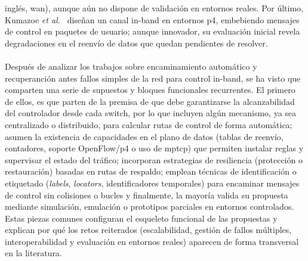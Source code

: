 inglés, \gls{wan}), aunque aún no dispone de validación en entornos reales.  Por último, Kumazoe \textit{et al.}~\cite{Kumazoe22} diseñan un canal in-band en entornos \gls{p4}, embebiendo mensajes de control en paquetes de usuario; aunque innovador, su evaluación inicial revela degradaciones en el reenvío de datos que quedan pendientes de resolver.\\
\\
Después de analizar los trabajos sobre encaminamiento automático y recuperanción antes fallos simples de la red para control in-band, se ha visto que comparten una serie de supuestos y bloques funcionales recurrentes. El primero de ellos, es que parten de la premisa de que debe garantizarse la alcanzabilidad del controlador desde cada switch, por lo que incluyen algún mecanismo, ya sea centralizado o distribuido, para calcular rutas de control de forma automática; asumen la existencia de capacidades en el plano de datos (tablas de reenvío, contadores, soporte OpenFlow/\gls{p4} o uso de \gls{mptcp}) que permiten instalar reglas y supervisar el estado del tráfico; incorporan estrategias de resiliencia (protección o restauración) basadas en rutas de respaldo; emplean técnicas de identificación o etiquetado (\textit{labels}, \textit{locators}, identificadores temporales) para encaminar mensajes de control sin colisiones o bucles y finalmente, la mayoría valida su propuesta mediante simulación, emulación o prototipos parciales en entornos controlados. Estas piezas comunes configuran el esqueleto funcional de las propuestas y explican por qué los retos reiterados (escalabilidad, gestión de fallos múltiples, interoperabilidad y evaluación en entornos reales) aparecen de forma transversal en la literatura.\\
\\
